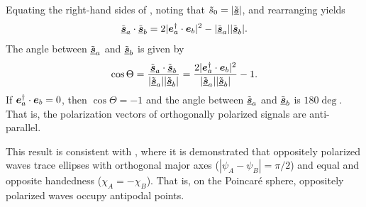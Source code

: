 \noindent
Equating the right-hand sides of ,
noting that $\tilde{s}_0 = |\tilde{\underline{\mbox{\boldmath $s$}}}|$, and rearranging yields
%
\begin{equation}
 \tilde{\underline{\mbox{\boldmath $s$}}}_a \cdot \tilde{\underline{\mbox{\boldmath $s$}}}_b = 2 | \mbox{\boldmath $e$}_a^\dagger \cdot \mbox{\boldmath $e$}_b |^2 - |\tilde{\underline{\mbox{\boldmath $s$}}}_a| |\tilde{\underline{\mbox{\boldmath $s$}}}_b|.
\end{equation}
%
The angle between $\tilde{\underline{\mbox{\boldmath $s$}}}_a$ and $\tilde{\underline{\mbox{\boldmath $s$}}}_b$ is given by
%
\begin{equation}
\cos\Theta = \frac{\tilde{\underline{\mbox{\boldmath $s$}}}_a \cdot \tilde{\underline{\mbox{\boldmath $s$}}}_b}{|\tilde{\underline{\mbox{\boldmath $s$}}}_a| |\tilde{\underline{\mbox{\boldmath $s$}}}_b|} = \frac{2 | \mbox{\boldmath $e$}_a^\dagger \cdot \mbox{\boldmath $e$}_b |^2}{|\tilde{\underline{\mbox{\boldmath $s$}}}_a| |\tilde{\underline{\mbox{\boldmath $s$}}}_b|} - 1.
\end{equation}
%
If $\mbox{\boldmath $e$}_a^\dagger \cdot \mbox{\boldmath $e$}_b = 0$, then $\cos\Theta=-1$ and the angle between $\tilde{\underline{\mbox{\boldmath $s$}}}_a$ and $\tilde{\underline{\mbox{\boldmath $s$}}}_b$ is $180\deg$.  That is, the polarization vectors of orthogonally polarized signals are anti-parallel.

This result is consistent with \citet{sto52}, where it is demonstrated that oppositely polarized waves
trace ellipses with orthogonal major axes ($\left| \psi_A - \psi_B \right| = \pi/2$) and equal and opposite handedness ($\chi_A = - \chi_B$).
%
That is, on the Poincar\'{e} sphere, oppositely polarized waves occupy antipodal points.
